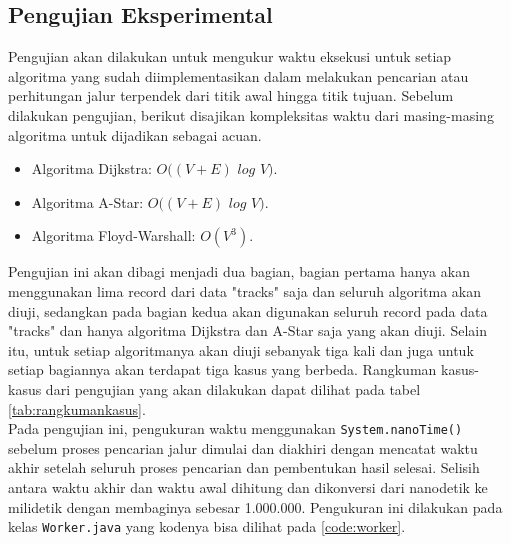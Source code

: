 \subsection{Pengujian Eksperimental}
\label{subsec:pengujianeksperimental}
Pengujian akan dilakukan untuk mengukur waktu eksekusi untuk setiap algoritma yang sudah diimplementasikan dalam melakukan pencarian atau perhitungan jalur terpendek dari titik awal hingga titik tujuan. Sebelum dilakukan pengujian, berikut disajikan kompleksitas waktu dari masing-masing algoritma untuk dijadikan sebagai acuan.
\begin{itemize}
    \item Algoritma Dijkstra: $O((V+E)$ $log$ $V)$.
    \item Algoritma A-Star: $O((V+E)$ $log$ $V)$.
    \item Algoritma Floyd-Warshall: $O(V^3)$.
\end{itemize}
\noindent
Pengujian ini akan dibagi menjadi dua bagian, bagian pertama hanya akan menggunakan lima record dari data "tracks" saja dan seluruh algoritma akan diuji, sedangkan pada bagian kedua akan digunakan seluruh record pada data "tracks" dan hanya algoritma Dijkstra dan A-Star saja yang akan diuji. Selain itu, untuk setiap algoritmanya akan diuji sebanyak tiga kali dan juga untuk setiap bagiannya akan terdapat tiga kasus yang berbeda. Rangkuman kasus-kasus dari pengujian yang akan dilakukan dapat dilihat pada tabel \ref{tab:rangkumankasus}.
\\
Pada pengujian ini, pengukuran waktu menggunakan \texttt{System.nanoTime()} sebelum proses pencarian jalur dimulai dan diakhiri dengan mencatat waktu akhir setelah seluruh proses pencarian dan pembentukan hasil selesai. Selisih antara waktu akhir dan waktu awal dihitung dan dikonversi dari nanodetik ke milidetik dengan membaginya sebesar 1.000.000. Pengukuran ini dilakukan pada kelas \texttt{Worker.java} yang kodenya bisa dilihat pada \ref{code:worker}.


